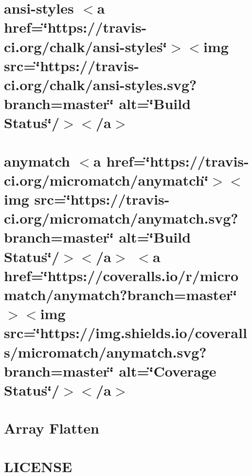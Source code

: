 \let\mypdfximage\pdfximage\def\pdfximage{\immediate\mypdfximage}\documentclass[twoside]{book}
\newcommand{\+}{\discretionary{\mbox{\scriptsize$\hookleftarrow$}}{}{}}
\begin{document}
\chapter{ansi-\/styles $<$a href=\char`\"{}https\+://travis-\/ci.\+org/chalk/ansi-\/styles\char`\"{}$>$$<$img src=\char`\"{}https\+://travis-\/ci.\+org/chalk/ansi-\/styles.\+svg?branch=master\char`\"{} alt=\char`\"{}\+Build Status\char`\"{}/$>$$<$/a$>$}
\label{md__c_1__git_hub__p_r_o_y_e_c_t_o-_i_i_i-_g_o_t_rest-api_node_modules_ansi-styles_readme}

\chapter{anymatch $<$a href=\char`\"{}https\+://travis-\/ci.\+org/micromatch/anymatch\char`\"{}$>$$<$img src=\char`\"{}https\+://travis-\/ci.\+org/micromatch/anymatch.\+svg?branch=master\char`\"{} alt=\char`\"{}\+Build Status\char`\"{}/$>$$<$/a$>$ $<$a href=\char`\"{}https\+://coveralls.\+io/r/micromatch/anymatch?branch=master\char`\"{}$>$$<$img src=\char`\"{}https\+://img.\+shields.\+io/coveralls/micromatch/anymatch.\+svg?branch=master\char`\"{} alt=\char`\"{}\+Coverage Status\char`\"{}/$>$$<$/a$>$}
\label{md__c_1__git_hub__p_r_o_y_e_c_t_o-_i_i_i-_g_o_t_rest-api_node_modules_anymatch__r_e_a_d_m_e}

\chapter{Array Flatten}
\label{md__c_1__git_hub__p_r_o_y_e_c_t_o-_i_i_i-_g_o_t_rest-api_node_modules_array-flatten__r_e_a_d_m_e}

\chapter{L\+I\+C\+E\+N\+SE}
\label{md__c_1__git_hub__p_r_o_y_e_c_t_o-_i_i_i-_g_o_t_rest-api_node_modules_balanced-match__l_i_c_e_n_s_e}

\end{document}
